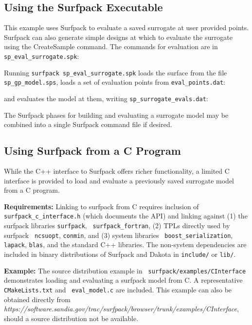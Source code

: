 \documentclass{article}
\begin{document}
\subsection{Using the Surfpack Executable}

This example uses Surfpack to evaluate a saved surrogate at user
provided points.  Surfpack can also generate simple designs at which
to evaluate the surrogate using the CreateSample command.  The
commands for evaluation are in {\tt sp\_eval\_surrogate.spk}:\\
\begin{bigbox}

\end{bigbox}
Running {\tt surfpack sp\_eval\_surrogate.spk} loads the surface from
the file {\tt sp\_gp\_model.sps}, loads a
set of evaluation points from {\tt eval\_points.dat}:\\
\begin{bigbox}

\end{bigbox}

and evaluates the model at them, writing {\tt sp\_surrogate\_evals.dat}:\\
\begin{bigbox}

\end{bigbox}

The Surfpack phases for building and evaluating a surrogate model may
be combined into a single Surfpack command file if desired.

\subsection{Using Surfpack from a C Program}

While the C++ interface to Surfpack offers richer functionality, a
limited C interface is provided to load and evaluate a previously
saved surrogate model from a C program.

{\bf Requirements:} Linking to surfpack from C requires inclusion of {\tt
  surfpack\_c\_interface.h} (which documents the API) and linking
against (1) the surfpack libraries {\tt surfpack}, {\tt
  surfpack\_fortran}, (2) TPLs directly used by surfpack {\tt
  ncsuopt}, {\tt conmin}, and (3) system libraries {\tt
  boost\_serialization}, {\tt lapack}, {\tt blas}, and the standard
C++ libraries.  The non-system dependencies are included in binary
distributions of Surfpack and Dakota in {\tt include/} or {\tt lib/}.

{\bf Example:} The source distribution example in {\tt
  surfpack/examples/CInterface} demonstrates loading and evaluating a
surfpack model from C.  A representative {\tt CMakeLists.txt} and {\tt
  eval\_model.c} are included.  This example can also be obtained
directly from \\
{\em
  https://software.sandia.gov/trac/surfpack/browser/trunk/examples/CInterface},
should a source distribution not be available.
\end{document}
